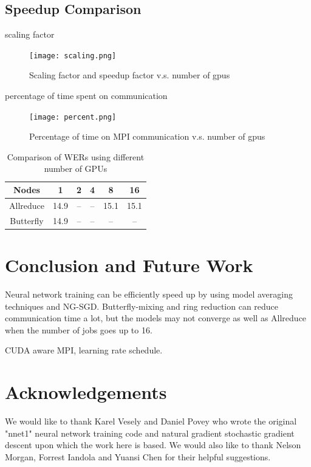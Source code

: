 \documentclass{article}
\begin{document}
\subsection{Speedup Comparison}
scaling factor
\begin{figure}[htb]
  \centering
  \texttt{[image: scaling.png]}
  \caption{Scaling factor and speedup factor v.s. number of gpus}
  \label{fig:scaling}
\end{figure}

percentage of time spent on communication
\begin{figure}[htb]
  \centering
  \texttt{[image: percent.png]}
  \caption{Percentage of time on MPI communication v.s. number of gpus}
  \label{fig:percent}
\end{figure}

\begin{table}
  \centering
  \begin{tabular}{c|c|c|c|c|c}
    \hline
     Nodes  & 1    & 2    & 4    & 8    & 16 \\
    \hline
Allreduce &    14.9 & -- & -- & 15.1 & 15.1 \\
    \hline
Butterfly &    14.9 & -- & -- & -- & --\\
    \hline
  \end{tabular}
  \caption{Comparison of WERs using different number of GPUs }
  \label{tab:wer}
\end{table}


\section{Conclusion and Future Work}
Neural network training can be efficiently speed up by using model averaging techniques and NG-SGD. 
Butterfly-mixing and ring reduction can reduce communication time a lot, but the models may not converge as well as 
Allreduce when the number of jobs goes up to 16.


CUDA aware MPI, learning rate schedule.


\section{Acknowledgements}
We would like to thank Karel Vesely and Daniel Povey who wrote the original "nnet1" neural network training code
and natural gradient stochastic gradient descent upon which the work here is based. We would also like to thank Nelson 
Morgan, Forrest Iandola and Yuansi Chen for their helpful suggestions.



\end{document}
